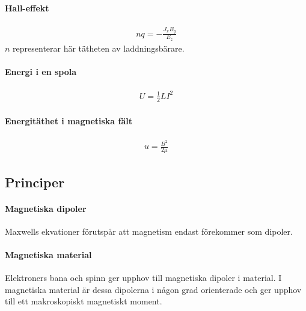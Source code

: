 \paragraph{Hall-effekt}
\begin{align*}
	nq = -\frac{J_xB_y}{E_z}
\end{align*}
$n$ representerar här tätheten av laddningsbärare.

\paragraph{Energi i en spola}
\begin{align*}
	U = \frac{1}{2}LI^2
\end{align*}

\paragraph{Energitäthet i magnetiska fält}
\begin{align*}
	u = \frac{B^2}{2\mu}
\end{align*}

\subsection{Principer}

\paragraph{Magnetiska dipoler}
Maxwells ekvationer förutspår att magnetism endast förekommer som dipoler.

\paragraph{Magnetiska material}
Elektroners bana och spinn ger upphov till magnetiska dipoler i material. I magnetiska material är dessa dipolerna i någon grad orienterade och ger upphov till ett makroskopiskt magnetiskt moment.